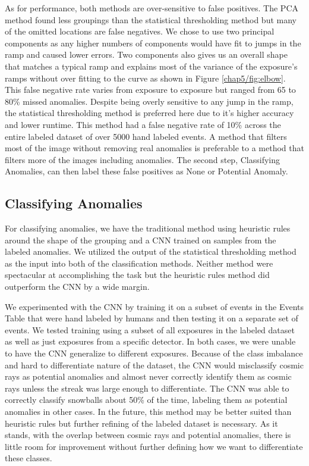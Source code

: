 As for performance, both methods are over-sensitive to false positives.
The PCA method found less groupings than the statistical thresholding method but many of the omitted locations are false negatives.
We chose to use two principal components as any higher numbers of components would have fit to jumps in the ramp and caused lower errors.
Two components also gives us an overall shape that matches a typical ramp and explains most of the variance of the exposure's ramps without over fitting to the curve as shown in Figure \ref{chap5/fig:elbow}.
This false negative rate varies from exposure to exposure but ranged from 65 to 80\% missed anomalies. 
Despite being overly sensitive to any jump in the ramp, the statistical thresholding method is preferred here due to it's higher accuracy and lower runtime.
This method had a false negative rate of 10\% across the entire labeled dataset of over 5000 hand labeled events. 
A method that filters most of the image without removing real anomalies is preferable to a method that filters more of the images including anomalies. The second step, Classifying Anomalies, can then label these false positives as None or Potential Anomaly. 
\subsection{Classifying Anomalies}
For classifying anomalies, we have the traditional method using heuristic rules around the shape of the grouping and a CNN trained on samples from the labeled anomalies. 
We utilized the output of the statistical thresholding method as the input into both of the classification methods. 
Neither method were spectacular at accomplishing the task but the heuristic rules method did outperform the CNN by a wide margin. 

We experimented with the CNN by training it on a subset of events in the Events Table that were hand labeled by humans and then testing it on a separate set of events. 
We tested training using a subset of all exposures in the labeled dataset as well as just exposures from a specific detector.
In both cases, we were unable to have the CNN generalize to different exposures. 
Because of the class imbalance and hard to differentiate nature of the dataset, the CNN would misclassify cosmic rays as potential anomalies and almost never correctly identify them as cosmic rays unless the streak was large enough to differentiate. 
The CNN was able to correctly classify snowballs about 50\% of the time, labeling them as potential anomalies in other cases. 
In the future, this method may be better suited than heuristic rules but further refining of the labeled dataset is necessary. 
As it stands, with the overlap between cosmic rays and potential anomalies, there is little room for improvement without further defining how we want to differentiate these classes. 

